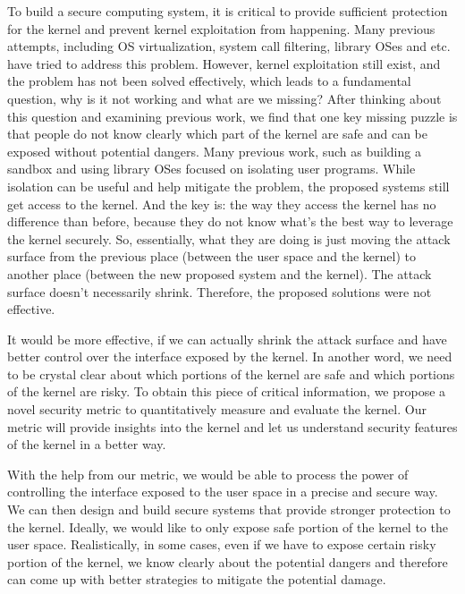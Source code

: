 To build a secure computing system, it is critical to provide sufficient protection for the kernel and 
prevent kernel exploitation from happening. Many previous attempts, including OS virtualization, 
system call filtering, library OSes and etc. have tried to address this problem. However, 
kernel exploitation still exist, and the problem has not been solved effectively, which leads to a 
fundamental question, why is it not working and what are we missing? After thinking about this
question and examining previous work, we find that one key missing puzzle is that people do not know 
clearly which part of the kernel are safe and can be exposed without potential dangers. Many previous
work, such as building a sandbox and using library OSes focused on isolating user programs. While isolation 
can be useful and help mitigate the problem, the proposed systems still get access to the kernel. 
And the key is: the way they access the kernel has no difference than before, because they do not 
know what's the best way to leverage the kernel securely. So, essentially, what they are doing is just moving 
the attack surface from the previous place (between the user space and the kernel) to another place 
(between the new proposed system and the kernel). The attack surface doesn't necessarily shrink. 
Therefore, the proposed solutions were not effective. 

It would be more effective, if we can actually shrink the attack surface and have better control over 
the interface exposed by the kernel. In another word, we need to be crystal clear about which portions of 
the kernel are safe and which portions of the kernel are risky. To obtain this piece of critical information, we
propose a novel security metric to quantitatively measure and evaluate the kernel. Our metric will provide
insights into the kernel and let us understand security features of the kernel in a better way. 

With the help from our metric, we would be able to process the power of controlling the interface 
exposed to the user space in a precise and secure way. We can then design and build secure systems 
that provide stronger protection to the kernel. Ideally, we would like to only expose safe portion 
of the kernel to the user space. Realistically, in some cases, even if we have to expose certain risky portion 
of the kernel, we know clearly about the potential dangers and therefore can come up with better 
strategies to mitigate the potential damage. 